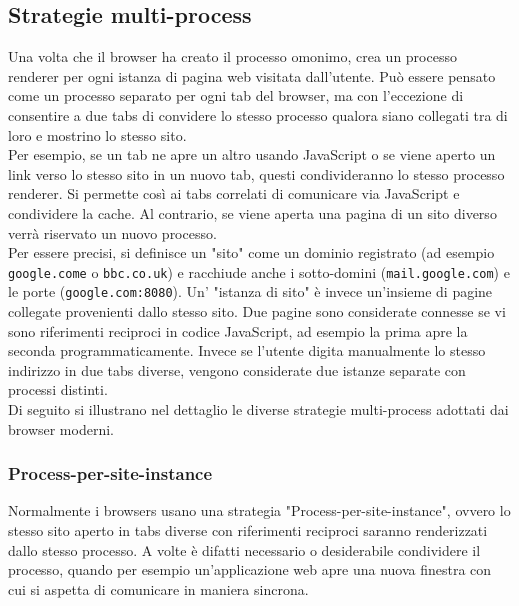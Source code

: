 \subsection{Strategie multi-process}

Una volta che il browser ha creato il processo omonimo, crea un processo renderer per ogni istanza di pagina web visitata dall'utente. Può essere pensato come un processo separato per ogni tab del browser, ma con l'eccezione di consentire a due tabs di convidere lo stesso processo qualora siano collegati tra di loro e mostrino lo stesso sito. \\

Per esempio, se un tab ne apre un altro usando JavaScript o se viene aperto un link verso lo stesso sito in un nuovo tab, questi condivideranno lo stesso processo renderer. Si permette così ai tabs correlati di comunicare via JavaScript e condividere la cache. Al contrario, se viene aperta una pagina di un sito diverso verrà riservato un nuovo processo. \\

Per essere precisi, si definisce un "sito" come un dominio registrato (ad esempio \texttt{google.come} o \texttt{bbc.co.uk}) e racchiude anche i sotto-domini (\texttt{mail.google.com}) e le porte (\texttt{google.com:8080}). Un' "istanza di sito" è invece un'insieme di pagine collegate provenienti dallo stesso sito. Due pagine sono considerate connesse se vi sono riferimenti reciproci in codice JavaScript, ad esempio la prima apre la seconda programmaticamente. Invece se l'utente digita manualmente lo stesso indirizzo in due tabs diverse, vengono considerate due istanze separate con processi distinti. \\

Di seguito si illustrano nel dettaglio le diverse strategie multi-process adottati dai browser moderni.

\subsubsection{Process-per-site-instance}

Normalmente i browsers usano una strategia "Process-per-site-instance", ovvero lo stesso sito aperto in tabs diverse con riferimenti reciproci saranno renderizzati dallo stesso processo. A volte è difatti necessario o desiderabile condividere il processo, quando per esempio un'applicazione web apre una nuova finestra con cui si aspetta di comunicare in maniera sincrona. \\

